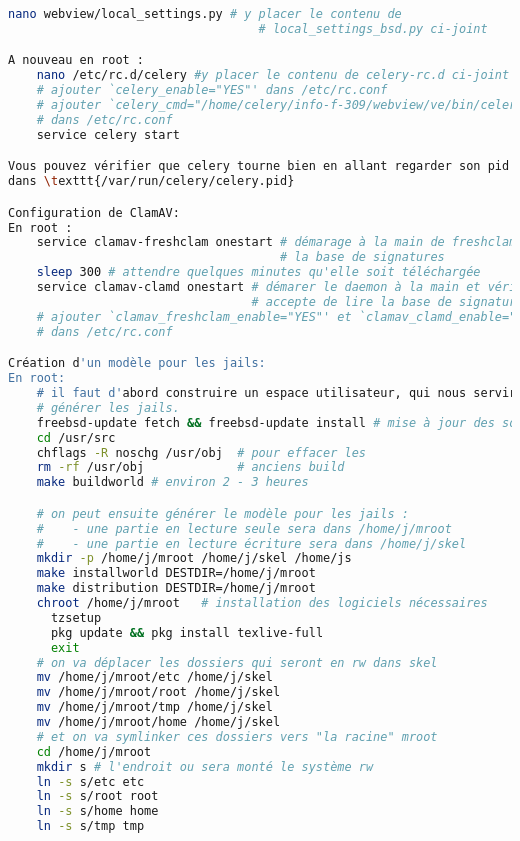 \documentclass[10pt,a4paper]{article}
\begin{document}
\begin{lstlisting}[language=bash]
    nano webview/local_settings.py # y placer le contenu de
                                   # local_settings_bsd.py ci-joint

A nouveau en root :
    nano /etc/rc.d/celery #y placer le contenu de celery-rc.d ci-joint
    # ajouter `celery_enable="YES"' dans /etc/rc.conf
    # ajouter `celery_cmd="/home/celery/info-f-309/webview/ve/bin/celery"'
    # dans /etc/rc.conf
    service celery start

Vous pouvez vérifier que celery tourne bien en allant regarder son pid
dans \texttt{/var/run/celery/celery.pid}

Configuration de ClamAV:
En root :
    service clamav-freshclam onestart # démarage à la main de freshclam pour télécharger
                                      # la base de signatures
    sleep 300 # attendre quelques minutes qu'elle soit téléchargée
    service clamav-clamd onestart # démarer le daemon à la main et vérifier qu'il
                                  # accepte de lire la base de signatures
    # ajouter `clamav_freshclam_enable="YES"' et `clamav_clamd_enable="YES"'
    # dans /etc/rc.conf

Création d'un modèle pour les jails:
En root:
    # il faut d'abord construire un espace utilisateur, qui nous servira à
    # générer les jails.
    freebsd-update fetch && freebsd-update install # mise à jour des sources
    cd /usr/src
    chflags -R noschg /usr/obj  # pour effacer les
    rm -rf /usr/obj             # anciens build
    make buildworld # environ 2 - 3 heures

    # on peut ensuite générer le modèle pour les jails :
    #    - une partie en lecture seule sera dans /home/j/mroot
    #    - une partie en lecture écriture sera dans /home/j/skel
    mkdir -p /home/j/mroot /home/j/skel /home/js
    make installworld DESTDIR=/home/j/mroot
    make distribution DESTDIR=/home/j/mroot
    chroot /home/j/mroot   # installation des logiciels nécessaires
      tzsetup
      pkg update && pkg install texlive-full
      exit
    # on va déplacer les dossiers qui seront en rw dans skel
    mv /home/j/mroot/etc /home/j/skel
    mv /home/j/mroot/root /home/j/skel
    mv /home/j/mroot/tmp /home/j/skel
    mv /home/j/mroot/home /home/j/skel
    # et on va symlinker ces dossiers vers "la racine" mroot
    cd /home/j/mroot
    mkdir s # l'endroit ou sera monté le système rw
    ln -s s/etc etc
    ln -s s/root root
    ln -s s/home home
    ln -s s/tmp tmp


\end{lstlisting}
\end{document}
